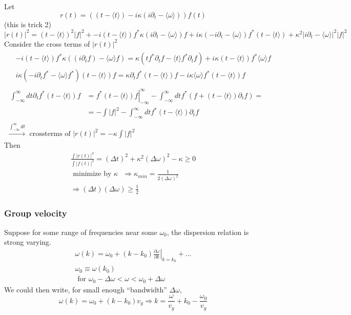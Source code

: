\documentclass[twoside, 10pt]{amsart}
\begin{document}
Let 
\[
r(t) = \left( (t- \langle t \rangle ) - i \kappa (i\partial_t - \langle \omega \rangle ) \right)f(t)
\]
(this is trick 2)
\[
|r(t)|^2 = (t-\langle t \rangle )^2 |f|^2 + -i (t- \langle t \rangle )f^* \kappa (i \partial_t - \langle \omega \rangle )f + i \kappa (-i\partial_t - \langle \omega \rangle)f^* (t- \langle t \rangle ) + \kappa^2 |i\partial_t - \langle \omega \rangle |^2 |f|^2
\]
Consider the cross terms of $|r(t)|^2$
\[
\begin{gathered}
\begin{aligned}
  & -i(t- \langle t \rangle )f^* \kappa ((i \partial_t f) - \langle \omega \rangle f ) = \kappa ( t f^* \partial_t f - \langle t \rangle f^* \partial_t f ) + i \kappa (t- \langle t \rangle ) f^* \langle \omega \rangle f \\
  & i \kappa (-i \partial_t f^* - \langle \omega \rangle f^* ) ( t- \langle t \rangle )f = \kappa \partial_t f^* (t- \langle t \rangle )f - i \kappa \langle \omega \rangle f^* (t- \langle t \rangle )f
\end{aligned} \\
\begin{aligned}
  \int_{-\infty}^{\infty} dt \partial_t f^* (t- \langle t \rangle )f & = \left. f^* (t- \langle t \rangle) f \right|_{-\infty}^{\infty} - \int_{-\infty}^{\infty} dt f^* (f + (t- \langle t \rangle ) \partial_t f ) = \\
  & = - \int |f|^2 - \int_{-\infty}^{\infty} dt f^* (t - \langle t \rangle) \partial_t f 
\end{aligned} \\
\xrightarrow{ \int_{-\infty}^{\infty} dt } \text{ crossterms of } |r(t)|^2 =  - \kappa \int |f|^2 
\end{gathered} 
\]
Then
\[
\begin{gathered}
  \frac{ \int |r(t)|^2}{ \int |f(t)|^2 } = (\Delta t)^2 + \kappa^2 (\Delta \omega)^2 - \kappa \geq 0 \\
  \text{ minimize by $\kappa$ } \Longrightarrow \kappa_{min} = \frac{1}{ 2 (\Delta \omega)^2 } \\
  \Longrightarrow (\Delta t)(\Delta \omega) \geq \frac{1}{2} 
\end{gathered}
\]
\subsubsection{ Group velocity }

Suppose for some range of frequencies near some $\omega_0$, the dispersion relation is strong varying. 
\[
\begin{gathered}
  \omega(k) = \omega_0 + (k-k_0) \left. \frac{ \partial \omega}{ \partial k }  \right|_{k=k_0} + \dots  \\
  \omega_0 \equiv \omega(k_0) \\
  \text{ for } \omega_0 - \Delta \omega < \omega < \omega_0 + \Delta \omega
\end{gathered}
\]
We could then write, for small enough ``bandwidth'' $\Delta \omega$, 
\[
  \omega(k) = \omega_0 + (k-k_0)v_g \Longrightarrow k = \frac{\omega}{v_g} + k_0 - \frac{\omega_0}{v_g}
\]
\end{document}
